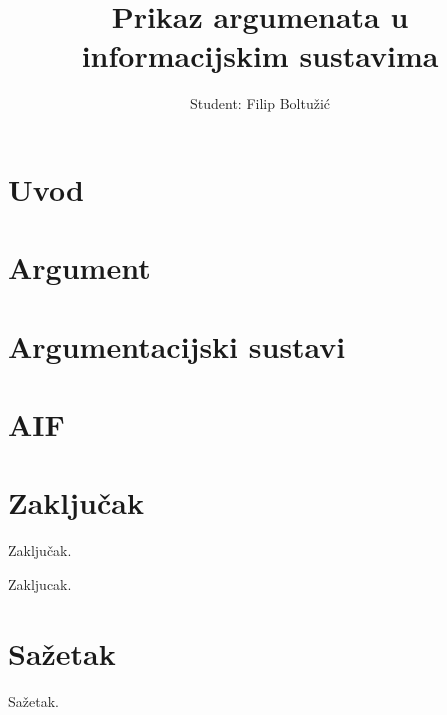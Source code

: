 \documentclass[times, utf8, seminar]{fer}
\begin{document}
\title{Prikaz argumenata u informacijskim sustavima}
% 
\author{Student: Filip Boltužić}
% 

\maketitle
 
\tableofcontents
 
\chapter{Uvod} 

 
\chapter{Argument} 

 
\chapter{Argumentacijski sustavi} 


\chapter{AIF}


\chapter{Zaključak} Zaključak.

Zakljucak. 

 

\chapter{Sažetak} Sažetak.
\end{document}
